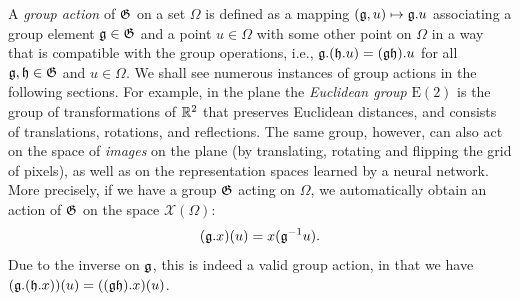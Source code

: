 A \emph{group action}  of ${\mathfrak{G}}$ on a set $\Omega$ 
is defined as a mapping $({\mathfrak{g}}, u) \mapsto {\mathfrak{g}}.u$ associating a group element ${\mathfrak{g}} \in {\mathfrak{G}}$ and a point $u\in \Omega$ with some other point on $\Omega$ in a way that 
is compatible with the group operations, i.e., ${\mathfrak{g}}.({\mathfrak{h}}.u) = ({\mathfrak{g}} {\mathfrak{h}}).u$ for all ${\mathfrak{g}}, {\mathfrak{h}} \in {\mathfrak{G}}$ and $u \in \Omega$. 
%
We shall see numerous instances of group actions in the following sections. 
%
For example, in the plane the {\em Euclidean group} $\mathrm{E}(2)$ is the group of transformations of $\mathbb{R}^2$ that preserves Euclidean distances, and consists of translations, rotations, and reflections.
The same group, however, can also act on the space of \emph{images} on the plane (by translating, rotating and flipping the grid of pixels), as well as on the representation spaces learned by a neural network.
%
%
More precisely, if we have a group ${\mathfrak{G}}$ acting on $\Omega$, we automatically obtain an action of ${\mathfrak{G}}$ on the space $\mathcal{X}(\Omega)$: 
\begin{equation}
    ({\mathfrak{g}} . x)(u) = x({\mathfrak{g}}^{-1} u).
    \label{eq:group_action}
\end{equation}
Due to the inverse on ${\mathfrak{g}}$, this is indeed a valid group action, in that we have $({\mathfrak{g}} . ({\mathfrak{h}} . x))(u) = (({\mathfrak{g}} {\mathfrak{h}}) . x)(u)$.  %


